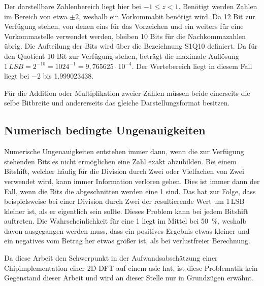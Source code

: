 Der darstellbare Zahlenbereich liegt hier bei $-1\leq z < 1$. Benötigt werden Zahlen im Bereich von etwa $\pm2$, weshalb ein Vorkommabit benötigt wird. 
Da 12 Bit zur Verfügung stehen, von denen eins für das Vorzeichen und ein weiters für eine Vorkommastelle verwendet werden, bleiben 10 Bits für die Nachkommazahlen übrig.
Die Aufteilung der Bits wird über die Bezeichnung S1Q10 definiert.
Da für den Quotient 10 Bit zur Verfügung stehen, beträgt die maximale Auflösung $1\,LSB = 2^{-10} = {1024}^{-1} = 9,765625\cdot10^{-4}$.
Der Wertebereich liegt in diesem Fall liegt bei \num{-2} bis \num{1,999023438}. 

Für die Addition oder Multiplikation zweier Zahlen müssen beide einerseits die selbe Bitbreite und andererseits das gleiche Darstellungsformat besitzen.



 
\subsection{Numerisch bedingte Ungenauigkeiten}\label{sec:NumerischeUngenauigkeiten}
Numerische Ungenauigkeiten entstehen immer dann, wenn die zur Verfügung stehenden Bits es nicht ermöglichen eine Zahl exakt abzubilden. 
Bei einem Bitshift, welcher häufig für die Division durch Zwei oder Vielfachen von Zwei verwendet wird, kann immer Information verloren gehen. Dies ist immer dann der Fall,
wenn die Bits die abgeschnitten werden eine 1 sind. Das hat zur Folge, dass beispielsweise
bei einer Division durch Zwei der resultierende Wert um 1\,LSB kleiner ist, als er eigentlich sein sollte. 
Dieses Problem kann bei jedem Bitshift auftreten. Die Wahrscheinlichkeit für eine 1 liegt im Mittel bei \SI{50}{\percent}, weshalb davon ausgegangen werden muss, dass ein 
positives Ergebnis etwas kleiner und ein negatives vom Betrag her etwas größer ist, als bei verlustfreier Berechnung. 


Da diese Arbeit den Schwerpunkt in der Aufwandsabschätzung einer Chipimplementation einer 2D-DFT auf einem \gls{asic} hat, ist diese Problematik kein Gegenstand dieser Arbeit und
wird an dieser Stelle nur in Grundzügen erwähnt. %

